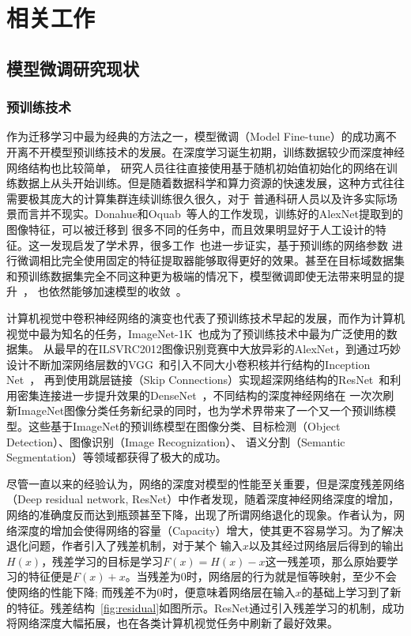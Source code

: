 
\chapter{相关工作}

\section{模型微调研究现状}

\subsection{预训练技术}

作为迁移学习中最为经典的方法之一，模型微调（Model Fine-tune）的成功离不开离不开模型预训练技术的发展。在深度学习诞生初期，训练数据较少而深度神经网络结构也比较简单，
研究人员往往直接使用基于随机初始值初始化的网络在训练数据上从头开始训练。但是随着数据科学和算力资源的快速发展，这种方式往往需要极其庞大的计算集群连续训练很久很久，对于
普通科研人员以及许多实际场景而言并不现实。Donahue和Oquab~\citep{donahue2014decaf,oquab2014learning}等人的工作发现，训练好的AlexNet提取到的图像特征，可以被迁移到
很多不同的任务中，而且效果明显好于人工设计的特征。这一发现启发了学术界，很多工作~\citep{agrawal2014analyzing,girshick2014rich}也进一步证实，基于预训练的网络参数
进行微调相比完全使用固定的特征提取器能够取得更好的效果。甚至在目标域数据集和预训练数据集完全不同这种更为极端的情况下，模型微调即使无法带来明显的提升~\citep{raghu2019transfusion}，
也依然能够加速模型的收敛~\citep{he2018rethinking}。

计算机视觉中卷积神经网络的演变也代表了预训练技术早起的发展，而作为计算机视觉中最为知名的任务，ImageNet-1K~\citep{deng_imagenet:_2009}也成为了预训练技术中最为广泛使用的数据集。
从最早的在ILSVRC2012图像识别竞赛中大放异彩的AlexNet，到通过巧妙设计不断加深网络层数的VGG~\citep{szegedy_going_2015}和引入不同大小卷积核并行结构的Inception Net~\citep{szegedy2016rethinking}，
再到使用跳层链接（Skip Connections）实现超深网络结构的ResNet~\citep{he2016deep}和利用密集连接进一步提升效果的DenseNet~\citep{huang_densely_2017}，不同结构的深度神经网络在
一次次刷新ImageNet图像分类任务新纪录的同时，也为学术界带来了一个又一个预训练模型。这些基于ImageNet的预训练模型在图像分类、目标检测（Object Detection）、图像识别（Image Recognization）、
语义分割（Semantic Segmentation）等领域都获得了极大的成功。

尽管一直以来的经验认为，网络的深度对模型的性能至关重要，但是深度残差网络（Deep residual network, ResNet）中作者发现，随着深度神经网络深度的增加，
网络的准确度反而达到瓶颈甚至下降，出现了所谓网络退化的现象。作者认为，网络深度的增加会使得网络的容量（Capacity）增大，使其更不容易学习。为了解决退化问题，作者引入了残差机制，对于某个
输入$x$以及其经过网络层后得到的输出$H(x)$，残差学习的目标是学习$F(x)=H(x)-x$这一残差项，那么原始要学习的特征便是$F(x)+x$。当残差为$0$时，网络层的行为就是恒等映射，至少不会使网络的性能下降;
而残差不为$0$时，便意味着网络层在输入$x$的基础上学习到了新的特征。残差结构~\ref{fig:residual}如图所示。ResNet通过引入残差学习的机制，成功将网络深度大幅拓展，也在各类计算机视觉任务中刷新了最好效果。

